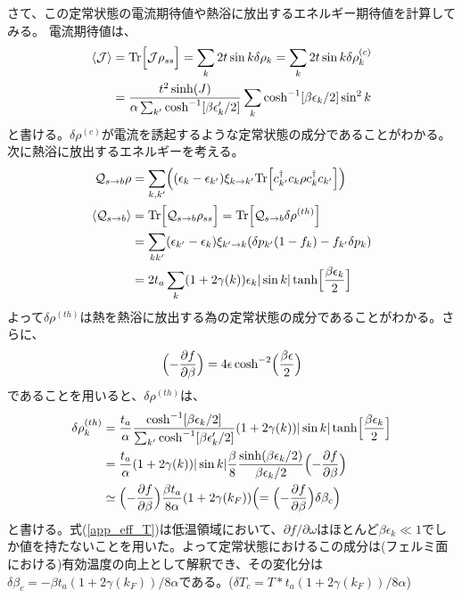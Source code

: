\documentclass[dvipdfmx,autodetect-engine]{jsarticle}
\newcommand{\p}{\partial}
\newcommand{\da}{\dagger}
\newcommand{\m}[1]{\mathcal{#1}}
\newcommand{\bv}[1]{\Bigl(#1\Bigr)}
\newcommand{\bg}[1]{\Bigl[#1\Bigr]}
\newcommand{\ttr}[1]{\mathrm{Tr}\Bigl[#1\Bigr]}
\begin{document}
さて、この定常状態の電流期待値や熱浴に放出するエネルギー期待値を計算してみる。
電流期待値は、
\begin{align}
    \ev{\m{J}} &= \ttr{\m{J} \rho_{ss}} = \sum_k2t\sin k \delta\rho_k = \sum_k2t\sin k \delta\rho^{(c)}_k\\
    &= \frac{t^2\sinh(J)}{\alpha\sum_{k'}\cosh^{-1}[\beta\epsilon_k'/2]}\sum_k \cosh^{-1}[\beta\epsilon_k/2] \sin^2 k
\end{align}
と書ける。$\delta\rho^{(c)}$が電流を誘起するような定常状態の成分であることがわかる。
次に熱浴に放出するエネルギーを考える。
\begin{align}
    \m{Q}_{s\rightarrow b}\rho  &= \sum_{k,k'}\bv{(\epsilon_k - \epsilon_{k'})\xi_{k\rightarrow k'}\ttr{c^\da_{k'}c_k\rho c^\da_kc_{k'}}}\\
    \ev{\m{Q}_{s\rightarrow b}} &= \ttr{\m{Q}_{s\rightarrow b}\rho_{ss}} = \ttr{\m{Q}_{s\rightarrow b}\delta\rho^{(th)}}\\
    &= \sum_{kk'}(\epsilon_{k'} - \epsilon_{k})\xi_{k'\rightarrow k} (\delta p_{k'}(1-f_k) - f_{k'}\delta p_k )\\
    &= 2t_a\sum_{k}(1+2\gamma(k))\epsilon_{k}|\sin k|\tanh\bg{\frac{\beta\epsilon_{k}}{2}}
\end{align}
よって$\delta\rho^{(th)}$は熱を熱浴に放出する為の定常状態の成分であることがわかる。さらに、
\begin{align}
    \bv{-\pdv{f}{\beta}} =  4\epsilon \cosh^{-2}\bv{\frac{\beta\epsilon}{2}}
\end{align}
であることを用いると、$\delta\rho^{(th)}$は、
\begin{align}
    \delta\rho^{(th)}_k &= \frac{t_a}{\alpha}\frac{\cosh^{-1}[\beta\epsilon_k/2]}{\sum_{k'}\cosh^{-1}[\beta\epsilon_k'/2]} (1+2\gamma(k))|\sin k|\tanh\bg{\frac{\beta\epsilon_k}{2}}\nonumber\\
    &= \frac{t_a}{\alpha}(1+2\gamma(k))|\sin k|\frac{\beta}{8}\frac{\sinh(\beta\epsilon_k/2)}{\beta\epsilon_k/2} \bv{-\pdv{f}{\beta}}\\
    &\simeq \bv{-\pdv{f}{\beta}}\frac{\beta t_a}{8\alpha}(1+2\gamma(k_F)) \bv{= \bv{-\pdv{f}{\beta}}\delta\beta_c}\label{app_eff_T}
\end{align}
と書ける。式(\ref{app_eff_T})は低温領域において、$\p f/\p\omega$はほとんど$\beta\epsilon_k \ll1$でしか値を持たないことを用いた。よって定常状態におけるこの成分は(フェルミ面における)有効温度の向上として解釈でき、その変化分は$\delta\beta_c = -\beta t_a(1+2\gamma(k_F))/8\alpha$である。($\delta T_c = T*t_a(1+2\gamma(k_F))/8\alpha$)
\end{document}
